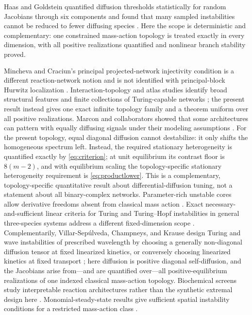 \documentclass[11pt]{article}
\theoremstyle{definition}
\newcommand{\1}{\mathbf 1}
\begin{document}
Haas and Goldstein quantified diffusion thresholds statistically for random
Jacobians through six components and found that many sampled instabilities
cannot be reduced to fewer diffusing species \cite{HaasGoldstein2021}.  Here
the scope is deterministic and complementary: one constrained mass-action
topology is treated exactly in every dimension, with all positive
realizations quantified and nonlinear branch stability proved.

Mincheva and Craciun's principal projected-network injectivity condition is a
different reaction-network notion and is not identified with principal-block
Hurwitz localization \cite{MinchevaCraciun2013}.  Interaction-topology and
atlas studies identify broad structural features and finite collections of
Turing-capable networks \cite{Marcon2016,Diego2018,Scholes2019}; the present
result instead gives one exact infinite topology family and a theorem uniform
over all positive realizations.
Marcon and collaborators showed that some architectures can pattern with
equally diffusing signals under their modeling assumptions \cite{Marcon2016}.
For the present topology, equal diagonal diffusion cannot destabilize: it only
shifts the homogeneous spectrum left.  Instead, the required stationary
heterogeneity is quantified exactly by \eqref{eq:criterion}; at unit
equilibrium its contrast floor is $8(m-2)$, and with equilibrium scaling the
topology-specific stationary heterogeneity requirement is
\eqref{eq:productlower}.  This is a complementary,
topology-specific quantitative result about differential-diffusion tuning, not
a statement about all binary-complex networks.  Parameter-rich unstable cores
allow derivative
freedoms absent from classical mass action \cite{VassenaStadler2024}.
Exact necessary-and-sufficient linear criteria for Turing and Turing--Hopf
instabilities in general three-species systems address a different
fixed-dimension scope \cite{Piskovsky2025}.  Complementarily,
Villar-Sep\'ulveda, Champneys, and Krause design Turing and wave instabilities
of prescribed wavelength by choosing a generally non-diagonal diffusion
tensor at fixed linearized kinetics, or conversely choosing linearized
kinetics at fixed transport \cite{VillarChampneysKrause2025}; here diffusion
is positive diagonal self-diffusion, and the Jacobians arise from---and are
quantified over---all positive-equilibrium realizations of one indexed
classical mass-action topology.  Biochemical screens study interpretable reaction
architectures rather than the synthetic extremal design here
\cite{Paul2024}.  Monomial-steady-state results give sufficient spatial
instability conditions for a restricted mass-action class
\cite{ConradiMinchevaUecker2026}.
\end{document}
